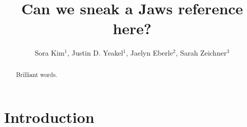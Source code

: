 \documentclass[]{rsos}%
\begin{document}
\title{Can we sneak a Jaws reference here?}

\author{%
Sora Kim$^{1}$, Justin D. Yeakel$^{1}$, Jaelyn Eberle$^{2}$, Sarah Zeichner$^{3}$}

\address{$^{1}$School of Natural Science, University of California Merced,
$^{2}$Department of Geological Sciences and Museum of Natural History, University of Colorado,
$^{3}$Division of Geological and Planetary Sciences, California Institute of Technology}


\subject{paleontology, taphonomy, ecology, body size}



\begin{abstract}
Brilliant words.
\end{abstract}


\maketitle

\section{Introduction}

\end{document}

